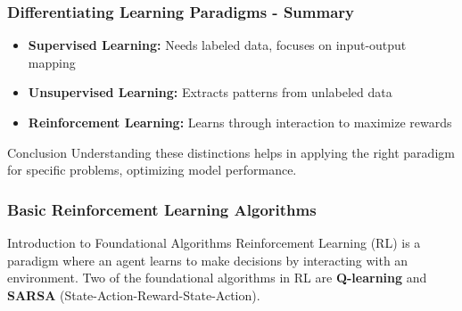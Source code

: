 \documentclass[aspectratio=169]{beamer}
\begin{document}
\begin{frame}[fragile]
    \frametitle{Differentiating Learning Paradigms - Summary}
    \begin{itemize}
        \item \textbf{Supervised Learning:} Needs labeled data, focuses on input-output mapping
        \item \textbf{Unsupervised Learning:} Extracts patterns from unlabeled data
        \item \textbf{Reinforcement Learning:} Learns through interaction to maximize rewards
    \end{itemize}
    \begin{block}{Conclusion}
        Understanding these distinctions helps in applying the right paradigm for specific problems, optimizing model performance.
    \end{block}
\end{frame}

\begin{frame}[fragile]
    \frametitle{Basic Reinforcement Learning Algorithms}
    \begin{block}{Introduction to Foundational Algorithms}
        Reinforcement Learning (RL) is a paradigm where an agent learns to make decisions by interacting with an environment. 
        Two of the foundational algorithms in RL are \textbf{Q-learning} and \textbf{SARSA} (State-Action-Reward-State-Action).
    \end{block}
\end{frame}
\end{document}
